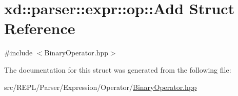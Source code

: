 \hypertarget{structxd_1_1parser_1_1expr_1_1op_1_1_add}{}\section{xd\+:\+:parser\+:\+:expr\+:\+:op\+:\+:Add Struct Reference}
\label{structxd_1_1parser_1_1expr_1_1op_1_1_add}


{\ttfamily \#include $<$Binary\+Operator.\+hpp$>$}



The documentation for this struct was generated from the following file\+:\begin{DoxyCompactItemize}
\item 
src/\+R\+E\+P\+L/\+Parser/\+Expression/\+Operator/\mbox{\hyperlink{_binary_operator_8hpp}{Binary\+Operator.\+hpp}}\end{DoxyCompactItemize}
